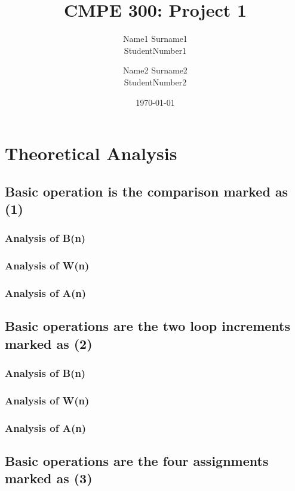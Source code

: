 \documentclass[11pt, oneside, a4paper]{article}
\title{CMPE 300: Project 1}
\author{
	Name1 Surname1\\StudentNumber1
	\and
	Name2 Surname2\\StudentNumber2
}
\date{\today}
\begin{document}
	\maketitle

	\tableofcontents

	\newpage

	\section{Theoretical Analysis}

	\subsection{Basic operation is the comparison marked as (1)}

	\subsubsection{Analysis of B(n)}

	\subsubsection{Analysis of W(n)}

	\subsubsection{Analysis of A(n)}

	\subsection{Basic operations are the two loop increments marked as (2)}

	\subsubsection{Analysis of B(n)}

	\subsubsection{Analysis of W(n)}

	\subsubsection{Analysis of A(n)}

	\subsection{Basic operations are the four assignments marked as (3)}
\end{document}
